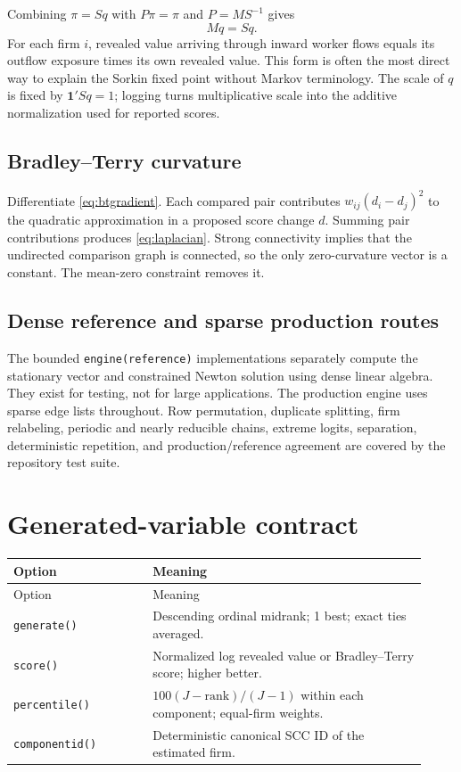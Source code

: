 \documentclass[11pt]{article}
\begin{document}
Combining $\pi=S q$ with $P\pi=\pi$ and $P=MS^{-1}$ gives
\begin{equation}
  Mq=S q.
  \label{eq:sorkin-balance}
\end{equation}
For each firm $i$, revealed value arriving through inward worker flows equals
its outflow exposure times its own revealed value. This form is often the most
direct way to explain the Sorkin fixed point without Markov terminology. The
scale of $q$ is fixed by $\mathbf{1}'Sq=1$; logging turns multiplicative scale
into the additive normalization used for reported scores.

\subsection{Bradley--Terry curvature}

Differentiate \cref{eq:btgradient}. Each compared pair contributes
$w_{ij}(d_i-d_j)^2$ to the quadratic approximation in a proposed score change
$d$. Summing pair contributions produces \cref{eq:laplacian}. Strong
connectivity implies that the undirected comparison graph is connected, so the
only zero-curvature vector is a constant. The mean-zero constraint removes it.

\subsection{Dense reference and sparse production routes}

The bounded \texttt{engine(reference)} implementations separately compute the
stationary vector and constrained Newton solution using dense linear algebra.
They exist for testing, not for large applications. The production engine uses
sparse edge lists throughout. Row permutation, duplicate splitting, firm
relabeling, periodic and nearly reducible chains, extreme logits, separation,
deterministic repetition, and production/reference agreement are covered by
the repository test suite.

\section{Generated-variable contract}

{\small
\begin{longtable}{@{}L{0.31\linewidth}L{0.61\linewidth}@{}}
\toprule
Option & Meaning \\
\midrule
\endfirsthead
\toprule
Option & Meaning \\
\midrule
\endhead
\texttt{generate()} & Descending ordinal midrank; 1 best; exact ties averaged. \\
\texttt{score()} & Normalized log revealed value or Bradley--Terry score; higher better. \\
\texttt{percentile()} & $100(J-\mathrm{rank})/(J-1)$ within each component; equal-firm weights. \\
\texttt{componentid()} & Deterministic canonical SCC ID of the estimated firm. \\
\bottomrule
\end{longtable}
}
\end{document}
